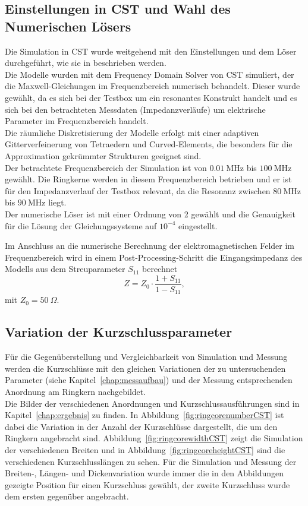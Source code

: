         \subsection{Einstellungen in CST und Wahl des Numerischen Lösers}
        Die Simulation in CST wurde weitgehend mit den Einstellungen und dem Löser durchgeführt, wie sie in \citep{bast2017ba} beschrieben werden.\\
        Die Modelle wurden mit dem Frequency Domain Solver von CST simuliert, der die Maxwell-Gleichungen im Frequenzbereich numerisch behandelt. Dieser wurde gewählt, da es sich bei der Testbox um ein resonantes Konstrukt handelt und es sich bei den betrachteten Messdaten (Impedanzverläufe) um elektrische Parameter im Frequenzbereich handelt.\\
        Die räumliche Diskretisierung der Modelle erfolgt mit einer adaptiven Gitterverfeinerung von Tetraedern und Curved-Elements, die besonders für die Approximation gekrümmter Strukturen geeignet sind.\\
        Der betrachtete Frequenzbereich der Simulation ist von $\SI{0,01}{\mega\hertz}$ bis $\SI{100}{\mega\hertz}$ gewählt. Die Ringkerne werden in diesem Frequenzbereich betrieben und er ist für den Impedanzverlauf der Testbox relevant, da die Resonanz zwischen $\SI{80}{\mega\hertz}$ bis $\SI{90}{\mega\hertz}$ liegt.\\
        Der numerische Löser ist mit einer Ordnung von 2 gewählt und die Genauigkeit für die Lösung der Gleichungssysteme auf $10^{-4}$ eingestellt.
        \par 
        Im Anschluss an die numerische Berechnung der elektromagnetischen Felder im Frequenzbereich wird in einem Post-Processing-Schritt die Eingangsimpedanz des Modells aus dem Streuparameter $S_{11}$ berechnet
            \begin{equation}
                Z = Z_0 \cdot\frac{1+S_{11}}{1-S_{11}},
            \end{equation}
        mit $Z_0 = \SI{50}{\Omega}$.
        
        \subsection{Variation der Kurzschlussparameter}
        Für die Gegenüberstellung und Vergleichbarkeit von Simulation und Messung werden die Kurzschlüsse mit den gleichen Variationen der zu untersuchenden Parameter (siehe Kapitel~\ref{chap:messaufbau}) und der Messung entsprechenden Anordnung am Ringkern  nachgebildet.\\
        Die Bilder der verschiedenen Anordnungen und Kurzschlussausführungen sind in Kapitel~\ref{chap:ergebnis} zu finden. In Abbildung~\ref{fig:ringcorenumberCST} ist dabei die Variation in der Anzahl der Kurzschlüsse dargestellt, die um den Ringkern angebracht sind. Abbildung~\ref{fig:ringcorewidthCST} zeigt die Simulation der verschiedenen Breiten und in Abbildung~\ref{fig:ringcoreheightCST} sind die verschiedenen Kurzschlusslängen zu sehen. Für die Simulation und Messung der Breiten-, Längen- und Dickenvariation wurde immer die in den Abbildungen gezeigte Position für einen Kurzschluss gewählt, der zweite Kurzschluss wurde dem ersten gegenüber angebracht.

